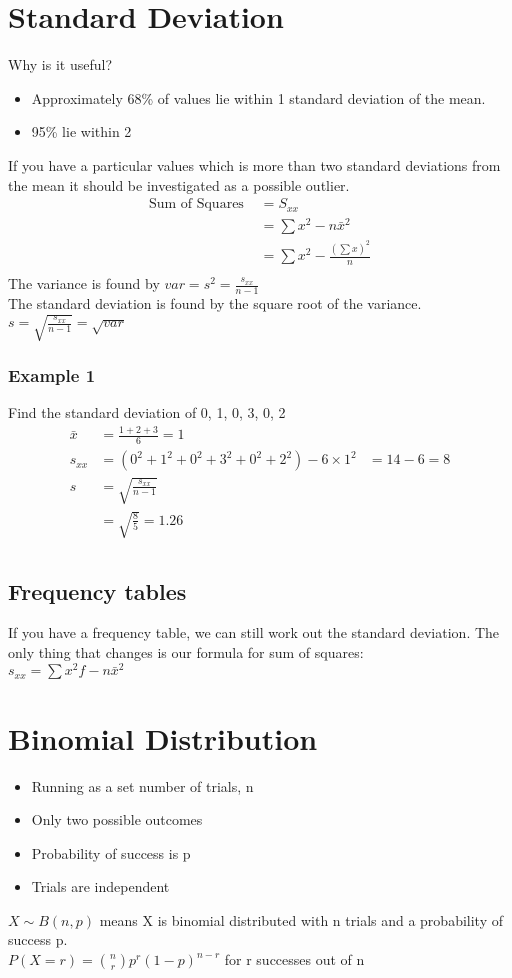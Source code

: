 \documentclass[class=article, crop=false]{standalone}
\begin{document}
\section*{Standard Deviation}
Why is it useful?
\begin{itemize}
	\item Approximately 68\% of values lie within 1 standard deviation of the mean. 
	\item 95\% lie within 2
\end{itemize}
If you have a particular values which is more than two standard deviations from the mean it should be investigated as a possible outlier. \\
\begin{align*}
\text{Sum of Squares } & = S_{xx} \\ 
& = \sum x^2 - n\bar{x}^2 \\
& = \sum x^2 - \frac{(\sum x)^2}{n} \\
\end{align*}
The variance is found by $var = s^2 = \frac{s_{xx}}{n-1}$ \\
The standard deviation is found by the square root of the variance. \\
$s = \sqrt{\frac{s_{xx}}{n-1}} = \sqrt{var}$

\subsubsection*{Example 1}
Find the standard deviation of 0, 1, 0, 3, 0, 2
\begin{align*}
\bar{x} & = \frac{1 + 2 + 3}{6} = 1 \\
s_{xx} & = (0^2 + 1^2 + 0^2 + 3^2 + 0^2 + 2^2) - 6 \times 1^2
& = 14-6 = 8 \\
s & = \sqrt{\frac{s_{xx}}{n-1}} \\
& = \sqrt{\frac{8}{5}} = 1.26 \\
\end{align*}

\subsection*{Frequency tables}
If you have a frequency table, we can still work out the standard deviation. The only thing that changes is our formula for sum of squares: \\
$s_{xx} = \sum x^2f - n\bar{x}^2$ \\

\section*{Binomial Distribution}
\begin{itemize}
	\item Running as a set number of trials, n
	\item Only two possible outcomes
	\item Probability of success is p
	\item Trials are independent
\end{itemize}
$X \sim B(n,p)$ means X is binomial distributed with n trials and a probability of success p. \\
$P(X=r) = \binom{n}{r}p^r(1-p)^{n-r}$ for r successes out of n
\end{document}
